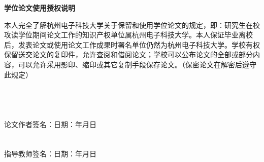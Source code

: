 \par\vspace*{30pt}
\begin{center}{\songti \textbf{学位论文使用授权说明}}\end{center}
\vspace*{10pt}
\renewcommand{\baselinestretch}{1.5}
{ \songti %
	
本人完全了解杭州电子科技大学关于保留和使用学位论文的规定，即：研究生在校攻读学位期间论文工作的知识产权单位属杭州电子科技大学。本人保证毕业离校后，发表论文或使用论文工作成果时署名单位仍然为杭州电子科技大学。学校有权保留送交论文的复印件，允许查阅和借阅论文；学校可以公布论文的全部或部分内容，可以允许采用影印、缩印或其它复制手段保存论文。（保密论文在解密后遵守此规定）
\\
\\
\\
\\
\\
{
	论文作者签名：\hspace{8em}日期：\hspace{7ex}年\hspace{5ex}月\hspace{5ex}日\\
	\\
	\\
	指导教师签名：\hspace{8em}日期：\hspace{7ex}年\hspace{5ex}月\hspace{5ex}日
}
}	






  \iflib
  \else
  \newpage
  \cleardoublepage
  \fi
\renewcommand{\baselinestretch}{1.6}
\small\normalsize




